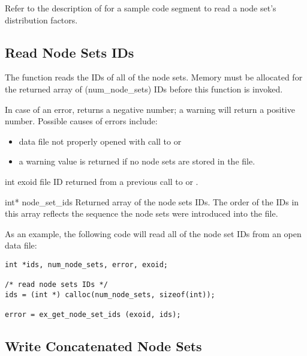 Refer to the description of  for a
sample code segment to read a node set's distribution factors.


\subsection{Read Node Sets IDs }

The function  reads the IDs of all of
the node sets. Memory must be allocated for the returned array of
({num_node_sets}) IDs before this function is invoked.

In case of an error,  returns 
a negative number; a warning will return a positive number.
Possible causes of errors include:

\begin{itemize}

 \item data file not properly opened with call to  
or 

 \item a warning value is returned if no node sets are stored 
in the file.
\end{itemize}


\begin{parameters}
\item[{int exoid \R{}}]
\exo{} file ID returned from a previous call to  
or .

\item[{int}{* node_set_ids \W{}}]
Returned array of the node sets IDs. The order of the IDs in this array
reflects the sequence the node sets were introduced into the file.
\end{parameters}

As an example, the following code will read all of the node set IDs
from an open data file:

\begin{lstlisting}
int *ids, num_node_sets, error, exoid;

/* read node sets IDs */
ids = (int *) calloc(num_node_sets, sizeof(int));

error = ex_get_node_set_ids (exoid, ids);
\end{lstlisting}

\subsection{Write Concatenated Node Sets}


